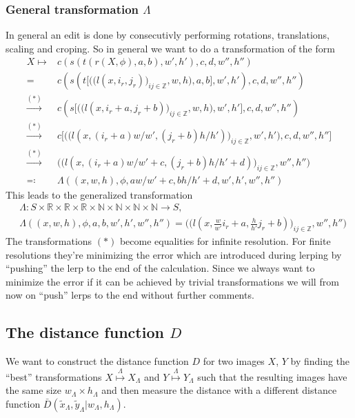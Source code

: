 \documentclass{article}
\begin{document}
\subsubsection{General transformation $\Lambda$}
In general an edit is done by consecutivly performing rotations, translations, scaling and croping. So in general we want to do a transformation of the form
\begin{align*}
X \mapsto& c(s(t(r(X, \phi), a, b), w', h'), c, d, w'', h'')\\
=& c(s(t\big[\big( \big(l(x, i_r, j_r )\big)_{ij\in \mathbb Z}, w, h \big), a, b\big], w', h'), c, d, w'', h'')\\
\overset {(*)}\to& c(s\big[\big( \big(l(x, i_r+a, j_r+b )\big)_{ij\in \mathbb Z}, w, h \big), w', h'\big], c, d, w'', h'')\\
\overset {(*)}\to& c\big[\big( \big(l(x, (i_r+a)w/w', (j_r+b)h/h' )\big)_{ij\in \mathbb Z}, w', h'\big), c, d, w'', h''\big] \\
\overset {(*)}\to& \big( \big(l(x, (i_r+a)w/w' + c, (j_r+b)h/h' + d)\big)_{ij\in \mathbb Z}, w'', h''\big) \\
\eqqcolon& \Lambda((x, w, h), \phi, aw/w'+c, bh/h' + d, w', h', w'', h'')
\end{align*}
This leads to the generalized transformation
\begin{align}
&\Lambda : S \times \mathbb R \times \mathbb R \times \mathbb R \times \mathbb N \times \mathbb N \times \mathbb N \times \mathbb N\to S,\nonumber\\
&\Lambda((x, w, h), \phi, a, b, w', h', w'', h'') = \big( \big(l(x, \frac w{w'}i_r + a, \frac h{h'}j_r + b)\big)_{ij\in \mathbb Z}, w'', h''\big)
\end{align}
The transformations $(*)$ become equalities for infinite resolution. For finite resolutions they're minimizing the error which are introduced during lerping by ``pushing'' the lerp to the end of the calculation. Since we always want to minimize the error if it can be achieved by trivial transformations we will from now on ``push'' lerps to the end without further comments.

\subsection{The distance function $D$}
We want to construct the distance function $D$ for two images $X$, $Y$ by finding the ``best'' transformations $X\overset\Lambda\mapsto X_\Lambda$ and $Y\overset\Lambda\mapsto Y_\Lambda$ such that the resulting images have the same size $w_\Lambda\times h_\Lambda$ and then measure the distance with a different distance function $\bar D(\tilde x_\Lambda, \tilde y_\Lambda | w_\Lambda, h_\Lambda)$.


\end{document}
